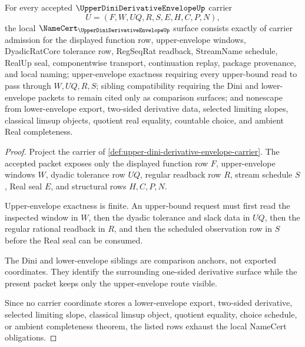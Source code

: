 \begin{theorem}
\label{thm:upper-dini-derivative-envelope-namecert-obligations}
For every accepted $\UpperDiniDerivativeEnvelopeUp$ carrier
$$
U=(F,W,UQ,R,S,E,H,C,P,N),
$$
the local $\NameCert_{\UpperDiniDerivativeEnvelopeUp}$ surface consists exactly of carrier admission for the displayed function row, upper-envelope windows, DyadicRatCore tolerance row, RegSeqRat readback, StreamName schedule, RealUp seal, componentwise transport, continuation replay, package provenance, and local naming; upper-envelope exactness requiring every upper-bound read to pass through $W,UQ,R,S$; sibling compatibility requiring the Dini and lower-envelope packets to remain cited only as comparison surfaces; and nonescape from lower-envelope export, two-sided derivative data, selected limiting slopes, classical limsup objects, quotient real equality, countable choice, and ambient Real completeness.
\end{theorem}
\begin{proof}
Project the carrier of \autoref{def:upper-dini-derivative-envelope-carrier}. The accepted packet exposes only the displayed function row $F$, upper-envelope windows $W$, dyadic tolerance row $UQ$, regular readback row $R$, stream schedule $S$, Real seal $E$, and structural rows $H,C,P,N$.

Upper-envelope exactness is finite. An upper-bound request must first read the inspected window in $W$, then the dyadic tolerance and slack data in $UQ$, then the regular rational readback in $R$, and then the scheduled observation row in $S$ before the Real seal can be consumed.

The Dini and lower-envelope siblings are comparison anchors, not exported coordinates. They identify the surrounding one-sided derivative surface while the present packet keeps only the upper-envelope route visible.

Since no carrier coordinate stores a lower-envelope export, two-sided derivative, selected limiting slope, classical limsup object, quotient equality, choice schedule, or ambient completeness theorem, the listed rows exhaust the local NameCert obligations.
\end{proof}


